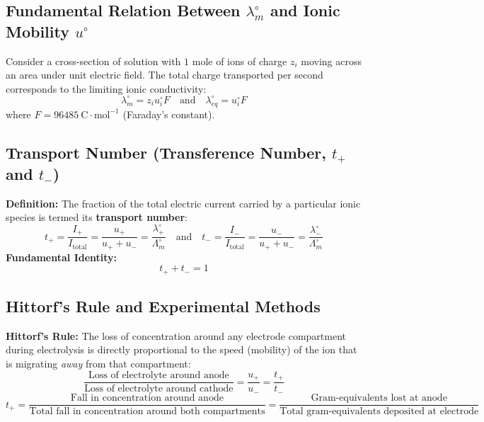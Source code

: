 \subsection{Fundamental Relation Between $\lambda_m^\circ$ and Ionic Mobility $u^\circ$}
Consider a cross-section of solution with $1\text{ mole}$ of ions of charge $z_i$ moving across an area under unit electric field. The total charge transported per second corresponds to the limiting ionic conductivity:
\begin{equation}
    \boxed{\lambda_m^\circ = z_i u_i^\circ F} \quad \text{and} \quad \boxed{\lambda_{eq}^\circ = u_i^\circ F}
\end{equation}
where $F = 96485\ \text{C}\cdot\text{mol}^{-1}$ (Faraday's constant).

\subsection{Transport Number (Transference Number, $t_+$ and $t_-$)}
\textbf{Definition:} The fraction of the total electric current carried by a particular ionic species is termed its \textbf{transport number}:
\begin{equation}
    t_+ = \frac{I_+}{I_{\text{total}}} = \frac{u_+}{u_+ + u_-} = \frac{\lambda_+^\circ}{\Lambda_m^\circ} \quad \text{and} \quad t_- = \frac{I_-}{I_{\text{total}}} = \frac{u_-}{u_+ + u_-} = \frac{\lambda_-^\circ}{\Lambda_m^\circ}
\end{equation}
\textbf{Fundamental Identity:}
\begin{equation}
    \boxed{t_+ + t_- = 1}
\end{equation}

\subsection{Hittorf's Rule and Experimental Methods}
\textbf{Hittorf's Rule:} The loss of concentration around any electrode compartment during electrolysis is directly proportional to the speed (mobility) of the ion that is migrating \emph{away} from that compartment:
\begin{equation}
    \frac{\text{Loss of electrolyte around anode}}{\text{Loss of electrolyte around cathode}} = \frac{u_+}{u_-} = \frac{t_+}{t_-}
\end{equation}
\begin{equation}
    t_+ = \frac{\text{Fall in concentration around anode}}{\text{Total fall in concentration around both compartments}} = \frac{\text{Gram-equivalents lost at anode}}{\text{Total gram-equivalents deposited at electrode}}
\end{equation}

